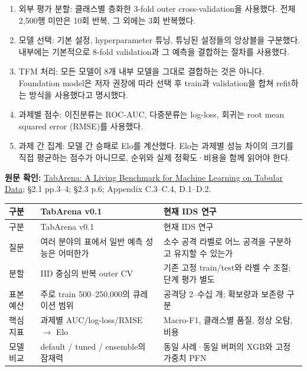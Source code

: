 \begin{enumerate}[leftmargin=*,itemsep=3pt]

\item 외부 평가 분할: 클래스별 층화한 3-fold outer cross-validation을 사용했다. 전체 2,500행 미만은 10회 반복, 그 외에는 3회 반복했다.

\item 모델 선택: 기본 설정, hyperparameter 튜닝, 튜닝된 설정들의 앙상블을 구분했다. 내부에는 기본적으로 8-fold validation과 그 예측을 결합하는 절차를 사용했다.

\item TFM 처리: 모든 모델이 8개 내부 모델을 그대로 결합하는 것은 아니다. Foundation model은 저자 권장에 따라 선택 후 train과 validation을 합쳐 refit하는 방식을 사용했다고 명시했다.

\item 과제별 점수: 이진분류는 ROC-AUC, 다중분류는 log-loss, 회귀는 root mean squared error (RMSE)를 사용했다.

\item 과제 간 집계: 모델 간 승패로 Elo를 계산했다. Elo는 과제별 성능 차이의 크기를 직접 평균하는 점수가 아니므로, 순위와 실제 정확도·비용을 함께 읽어야 한다.

\end{enumerate}

{\small\textbf{원문 확인:} \href{https://arxiv.org/abs/2506.16791}{TabArena: A Living Benchmark for Machine Learning on Tabular Data}; §2.1 pp.3–4; §2.3 p.6; Appendix C.3–C.4, D.1–D.2.}\par

\begingroup
\footnotesize
\begin{longtable}{>{\raggedright\arraybackslash}p{}>{\raggedright\arraybackslash}p{}>{\raggedright\arraybackslash}p{}}
\toprule
구분 & TabArena v0.1 & 현재 IDS 연구 \\ \midrule
\endfirsthead
구분 & TabArena v0.1 & 현재 IDS 연구 \\ \midrule
\endhead
{}질문 & 여러 분야의 표에서 일반 예측 성능은 어떠한가 & 소수 공격 라벨로 어느 공격을 구분하고 유지할 수 있는가 \\
{}분할 & IID 중심의 반복 outer CV & 기존 고정 train/\allowbreak{}test와 라벨 수 조절; 단계 평가 별도 \\
{}표본 예산 & 주로 train 500–250,000의 큐레이션 범위 & 공격당 2–수십 개; 확보량과 보존량 구분 \\
{}핵심 지표 & 과제별 AUC/\allowbreak{}log-loss/\allowbreak{}RMSE  \ensuremath{\rightarrow}  Elo & Macro-F1, 클래스별 품질, 정상 오탐, 비용 \\
{}모델 비교 & default /\allowbreak{} tuned /\allowbreak{} ensemble의 잠재력 & 동일 사례·동일 버퍼의 XGB와 고정 가중치 PFN \\
\bottomrule
\end{longtable}
\endgroup


